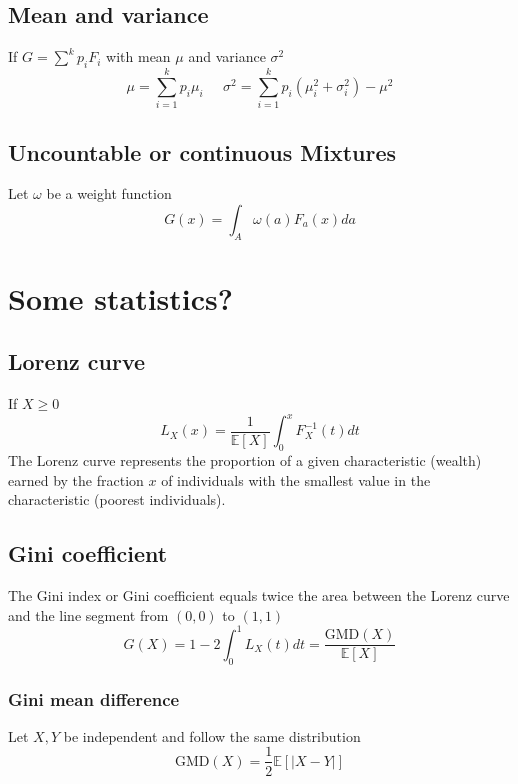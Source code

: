 
\subsection{Mean and variance}
If $G=\sum^kp_iF_i$ with mean $\mu$ and variance $\sigma^2$
\[ \mu = \sum_{i=1}^k p_i\mu_i \;\;\;\;\;
    \sigma^2 = \sum_{i=1}^k p_i(\mu^2_i+\sigma^2_i)-\mu^2
\]

\subsection{Uncountable or continuous Mixtures}
Let $\omega$ be a weight function 
\[ G(x) = \int_A \omega(a)F_a(x)da \]

\section{Some statistics?}
\subsection{Lorenz curve}
If $X\geq 0$ 
\[ L_X(x) = \frac{1}{\mathbb{E}[X]}\int_0^x F^{-1}_X(t)dt \] The Lorenz curve
represents the proportion of a given characteristic (wealth) earned by the
fraction $x$ of individuals with the smallest value in the characteristic (poorest
individuals). 

\subsection{Gini coefficient}
The Gini index or Gini coefficient equals twice the area between the Lorenz curve
and the line segment from $(0,0)$ to $(1,1)$
\[ G(X) = 1-2\int_0^1L_X(t)dt = \frac{\text{GMD}(X)}{\mathbb{E}[X]} \]
\subsubsection{Gini mean difference}
Let $X,Y$ be independent and follow the same distribution
\[ \text{GMD}(X) = \frac{1}{2}\mathbb{E}[|X-Y|] \]


